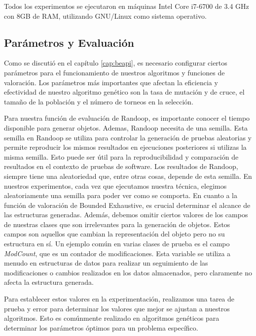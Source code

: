 Todos los experimentos se ejecutaron en máquinas Intel Core i7-6700 de 3.4 GHz con 8GB de RAM, utilizando GNU/Linux como sistema operativo. 



\subsection{Parámetros y Evaluación}
Como se discutió en el capítulo \ref{cap:beapi}, es necesario configurar ciertos parámetros para el funcionamiento de nuestros algoritmos y funciones de valoración. Los parámetros más importantes que afectan la eficiencia y efectividad de nuestro algoritmo genético son la tasa de mutación y de cruce, el tamaño de la población y el número de torneos en la selección. 

Para nuestra función de evaluación de Randoop, es importante conocer el tiempo disponible para generar objetos. Ademas, Randoop  necesita de una semilla. Esta semilla en Randoop se utiliza para controlar la generación de pruebas aleatorias y permite reproducir los mismos resultados en ejecuciones posteriores si utilizas la misma semilla. Esto puede ser útil para la reproducibilidad y comparación de resultados en el contexto de pruebas de software. Los resultados de Randoop, siempre tiene una aleatoriedad que, entre otras cosas, depende de esta semilla. En nuestros experimentos, cada vez que ejecutamos nuestra técnica, elegimos aleatoriamente una semilla para poder ver como se comporta. 
En cuanto a la función de valoración de Bounded Exhaustive, es crucial determinar el alcance de las estructuras generadas. Además, debemos omitir ciertos valores de los campos de nuestras clases que son irrelevantes para la generación de objetos. Estos campos son aquellos que cambian la representación del objeto pero no su estructura en sí. Un ejemplo común en varias clases de prueba es el campo \emph{ModCount}, que es un contador de modificaciones. Esta variable se utiliza a menudo en estructuras de datos para realizar un seguimiento de las modificaciones o cambios realizados en los datos almacenados, pero claramente no afecta la estructura generada.

Para establecer estos valores en la experimentación, realizamos una tarea de prueba y error para determinar los valores que mejor se ajustan a nuestros algoritmos. Esto es comúnmente realizado en algoritmos genéticos para determinar los parámetros óptimos para un problema específico.

